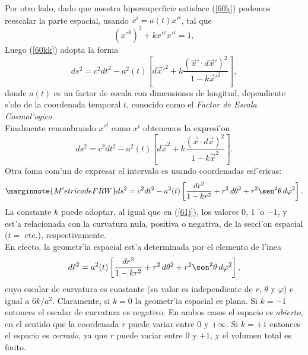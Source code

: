 Por otro lado, dado que nuestra hipersuperficie satisface (\ref{60k}) podemos reescalar la parte espacial, usando
$x^i=a(t)x'^{i}$,  tal que
\begin{equation}
(x'^{4})^{2} +kx'^{i}x'^{i}=1,
\end{equation}
Luego (\ref{60kk}) adopta la forma
\begin{equation}
ds^{2}= c^2dt^2 - a^{2}(t)\left[ d\vec{x}'^{2}+ k\frac{(\vec{x}'\cdot d\vec{x}')^{2}}{1-k\vec{x}'^{2}}\right],
\end{equation}
donde $a(t)$ es un factor de escala con dimensiones de longitud, dependiente s'olo de la coordenada temporal $t$, conocido
como el \textit{Factor de Escala Cosmol'ogico}.\\
Finalmente renombrando $x'^i$ como $x^i$ obtenemos la expresi'on
\begin{equation}
ds^{2}= c^2dt^2 - a^{2}(t)\left[ d\vec{x}^{2} + k\frac{(\vec{x}\cdot d\vec{x})^{2}}{1-k\vec{x}^{2}}\right].
\end{equation}
Otra foma com'un de expresar el intervalo es usando coordenadas esf'ericas:
\begin{equation}\marginnote{M'etrica de FRW}
 ds^2=c^2dt^2-a^2(t)\left[\frac{dr^2}{1-kr^2}+r^2\,d\theta^2+r^2\sen^2\theta\,d\varphi^2\right].\label{dsFRW}
\end{equation}
La constante $k$ puede adoptar, al igual que en (\ref{61j}), los valores $0$, $1$ 'o $-1$, y est'a relacionada con la curvatura nula, positiva o
negativa, de la secci'on espacial ($t=$ cte.), respectivamente.\\
En efecto, la geometr'ia espacial est'a determinada por el elemento de l'inea
\begin{equation}
 d\ell^2=a^2(t)\left[\frac{dr^2}{1-kr^2}+r^2\,d\theta^2+r^2\sen^2\theta\,d\varphi^2\right],
\end{equation}
cuyo escalar de curvatura es constante (su valor es independiente de $r$, $\theta$ y $\varphi$) e igual a $6k/a^2$.
Claramente, si $k=0$ la geometr'ia espacial es plana. Si $k=-1$ entonces el escalar de curvatura es negativo. En ambos 
casos el espacio es \textit{abierto}, en el sentido que la coordenada $r$ puede variar entre $0$ y $+\infty$. Si $k=+1$ 
entonces el espacio es \textit{cerrado}, ya que $r$ puede variar entre $0$ y $+1$, y el volumen total es finito.
